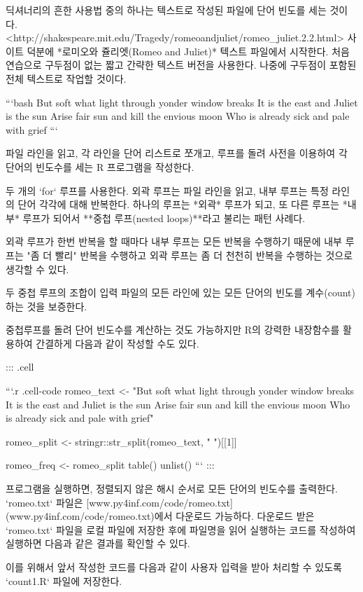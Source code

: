 \documentclass[
  letterpaper,
]{book}
\begin{document}
{딕셔너리의 흔한 사용법 중의 하나는 텍스트로 작성된 파일에 단어 빈도를 세는 것이다. 
<http://shakespeare.mit.edu/Tragedy/romeoandjuliet/romeo_juliet.2.2.html> 사이트 덕분에 *로미오와 쥴리엣(Romeo and Juliet)* 텍스트 파일에서 시작한다.
처음 연습으로 구두점이 없는 짧고 간략한 텍스트 버전을 사용한다. 나중에 구두점이 포함된 전체 텍스트로 작업할 것이다.

```bash
But soft what light through yonder window breaks
It is the east and Juliet is the sun
Arise fair sun and kill the envious moon
Who is already sick and pale with grief
```

파일 라인을 읽고, 각 라인을 단어 리스트로 쪼개고, 루프를 돌려 사전을 이용하여 각 단어의 빈도수를 세는 R 프로그램을 작성한다.

두 개의 `for` 루프를 사용한다. 외곽 루프는 파일 라인을 읽고, 내부 루프는 특정 라인의 단어 각각에 대해 반복한다. 
하나의 루프는 *외곽* 루프가 되고, 또 다른 루프는 *내부* 루프가 되어서 **중첩 루프(nested loops)**라고 불리는 패턴 사례다.

외곽 루프가 한번 반복을 할 때마다 내부 루프는 모든 반복을 수행하기 때문에 내부 루프는 "좀 더 빨리" 반복을 수행하고 외곽 루프는 좀 더 천천히 반복을 수행하는 것으로 생각할 수 있다.

두 중첩 루프의 조합이 입력 파일의 모든 라인에 있는 모든 단어의 빈도를 계수(count)하는 것을 보증한다.

중첩루프를 돌려 단어 빈도수를 계산하는 것도 가능하지만 R의 강력한 내장함수를 활용하여 간결하게 다음과 같이 작성할 수도 있다.



::: {.cell}

```{.r .cell-code}
romeo_text <- "But soft what light through yonder window breaks It is the east and Juliet is the sun Arise fair sun and kill the envious moon Who is already sick and pale with grief"

romeo_split <- stringr::str_split(romeo_text, " ")[[1]]

romeo_freq <- romeo_split %
  table() %
  unlist()
```
:::



프로그램을 실행하면, 정렬되지 않은 해시 순서로 모든 단어의 빈도수를 출력한다. 
`romeo.txt` 파일은 [www.py4inf.com/code/romeo.txt](www.py4inf.com/code/romeo.txt)에서 다운로드 가능하다. 
다운로드 받은 `romeo.txt` 파일을 로컬 파일에 저장한 후에 파일명을 읽어 실행하는 코드를 작성하여 실행하면 다음과 같은 결과를 확인할 수 있다.

이를 위해서 앞서 작성한 코드를 다음과 같이 사용자 입력을 받아 처리할 수 있도록 `count1.R` 파일에 저장한다.

}
\end{document}
